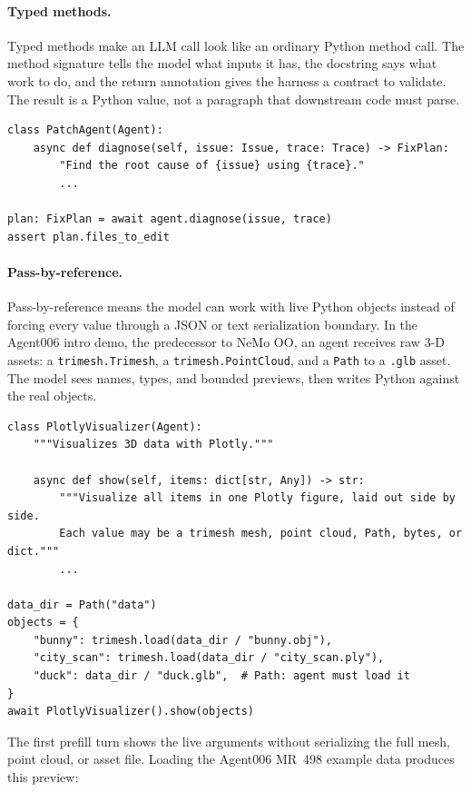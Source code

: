 \documentclass[11pt, logo, onecolumn, copyright, colorlinks=true, allcolors=blue]{nvidiatechreport}
\begin{document}
\paragraph{Typed methods.}
Typed methods make an LLM call look like an ordinary Python method call.  The
method signature tells the model what inputs it has, the docstring says what
work to do, and the return annotation gives the harness a contract to validate.
The result is a Python value, not a paragraph that downstream code must parse.

\begin{lstlisting}
class PatchAgent(Agent):
    async def diagnose(self, issue: Issue, trace: Trace) -> FixPlan:
        "Find the root cause of {issue} using {trace}."
        ...

plan: FixPlan = await agent.diagnose(issue, trace)
assert plan.files_to_edit
\end{lstlisting}


\paragraph{Pass-by-reference.}
Pass-by-reference means the model can work with live Python objects instead of
forcing every value through a JSON or text serialization boundary.  In the
Agent006 intro demo, the predecessor to NeMo OO, an agent receives raw 3-D
assets: a \texttt{trimesh.Trimesh}, a \texttt{trimesh.PointCloud}, and a
\texttt{Path} to a \texttt{.glb} asset.  The model sees names, types, and bounded
previews, then writes Python against the real objects.

\begin{lstlisting}
class PlotlyVisualizer(Agent):
    """Visualizes 3D data with Plotly."""

    async def show(self, items: dict[str, Any]) -> str:
        """Visualize all items in one Plotly figure, laid out side by side.
        Each value may be a trimesh mesh, point cloud, Path, bytes, or dict."""
        ...

data_dir = Path("data")
objects = {
    "bunny": trimesh.load(data_dir / "bunny.obj"),
    "city_scan": trimesh.load(data_dir / "city_scan.ply"),
    "duck": data_dir / "duck.glb",  # Path: agent must load it
}
await PlotlyVisualizer().show(objects)
\end{lstlisting}

The first prefill turn shows the live arguments without serializing the full
mesh, point cloud, or asset file.  Loading the Agent006 MR~498 example data
produces this preview:
\end{document}

